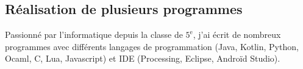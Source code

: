 \documentclass[11pt,oneside,a4paper,titlepage]{article}
\begin{document}
\begin{tcolorbox}
\begin{minipage}[t]{11cm}
\begin{tcolorbox}[grow to right by=0.75cm,colframe=white,colback=white]
      \subsection*{Réalisation de plusieurs programmes}
      Passionné par l'informatique depuis la classe de $5^{\text{e}}$, j'ai écrit de nombreux programmes avec différents langages de programmation (Java, Kotlin, Python, Ocaml, C, Lua, Javascript) et IDE (Processing, Eclipse, Androïd Studio).
    \end{tcolorbox}
  \end{minipage}
\end{tcolorbox}
\end{document}
